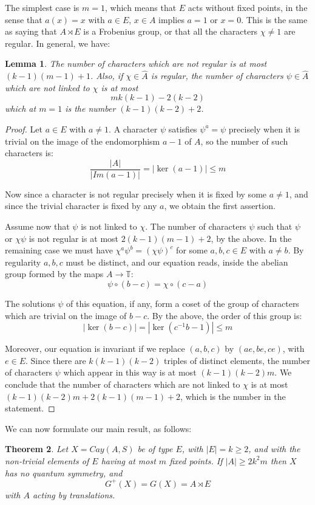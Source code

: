 \documentclass[11pt]{amsart}
\newtheorem{theorem}{Theorem}[section]
\newtheorem{lemma}[theorem]{Lemma}
\newcommand{\hA}{\widehat A}
\begin{document}
The simplest case is $m=1$, which means that $E$ acts without fixed points, in the sense that $a(x)=x$ with $a\in E$, $x\in A$ implies $a=1$ or $x=0$. This is the same as saying that $A\rtimes E$ is a Frobenius group, or that all the characters $\chi\neq1$ are regular. In general, we have:

\begin{lemma}
The number of characters which are not regular is at most $(k-1)(m-1)+1$. Also, if $\chi\in\hA$ is regular, the number of characters $\psi\in\hA$ which are not linked to $\chi$ is at most
$$mk(k-1)-2(k-2)$$
which at $m=1$ is the number $(k-1)(k-2)+2$.
\end{lemma}

\begin{proof}
Let $a\in E$ with $a\neq1$. A character $\psi$ satisfies $\psi^a=\psi$ precisely when it is trivial on the image of the endomorphism $a-1$ of $A$, so the number of such characters is:
$$\frac{|A|}{|Im(a-1)|}=|\ker(a-1)|\leq m$$

Now since a character is not regular precisely when it is fixed by some $a\neq1$, and since the trivial character is fixed by any $a$, we obtain the first assertion.

Assume now that $\psi$ is not linked to $\chi$. The number of characters $\psi$ such that $\psi$ or $\chi\psi$ is not regular is at most $2(k-1)(m-1)+2$, by the above. In the remaining case we must have $\chi^a\psi^b=(\chi\psi)^c$ for some $a,b,c\in E$ with $a\neq b$. By regularity $a,b,c$ must be distinct, and our equation reads, inside the abelian group formed by the maps $A\to\mathbb T$:
$$\psi\circ(b-c)=\chi\circ(c-a)$$

The solutions $\psi$ of this equation, if any, form a coset of the group of characters which are trivial on the image of $b-c$. By the above, the order of this group is:
$$|\ker(b-c)|=|\ker(c^{-1}b-1)|\leq m$$

Moreover, our equation is invariant if we replace $(a,b,c)$ by $(ae,be,ce)$, with $e\in E$. Since there are $k(k-1)(k-2)$ triples of distinct elements, the number of characters $\psi$ which appear in this way is at most $(k-1)(k-2)m$. We conclude that the number of characters which are not linked to $\chi$ is at most $(k-1)(k-2)m+2(k-1)(m-1)+2$, which is the number in the statement.
\end{proof}

We can now formulate our main result, as follows:

\begin{theorem}
Let $X=Cay(A,S)$ be of type $E$, with $|E|=k\geq2$, and with the non-trivial elements of $E$ having at most $m$ fixed points. If $|A|\geq2k^2m$ then $X$ has no quantum symmetry, and
$$G^+(X)=G(X)=A\rtimes E$$
with $A$ acting by translations.
\end{theorem}
\end{document}
